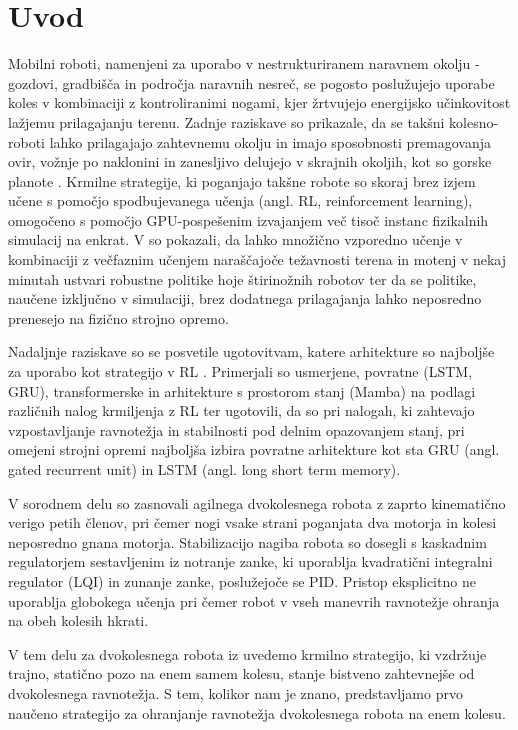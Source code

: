 \section{Uvod}

Mobilni roboti, namenjeni za uporabo v nestrukturiranem naravnem okolju - gozdovi, gradbišča in področja naravnih nesreč, se pogosto poslužujejo uporabe koles v kombinaciji z kontroliranimi nogami, kjer žrtvujejo energijsko učinkovitost lažjemu prilagajanju terenu. Zadnje raziskave so prikazale, da se takšni kolesno-roboti lahko prilagajajo zahtevnemu okolju in imajo sposobnosti premagovanja ovir, vožnje po naklonini in zanesljivo delujejo v skrajnih okoljih, kot so gorske planote \cite{Wang2025Whee}.
  Krmilne strategije, ki poganjajo takšne robote so skoraj brez izjem učene s pomočjo spodbujevanega učenja (angl. RL, reinforcement learning), omogočeno s pomočjo GPU-po\-spe\-še\-nim izvajanjem več tisoč instanc fizikalnih simulacij na enkrat. V \cite{Rudin2022Lear} so pokazali, da lahko množično vzporedno učenje v kombinaciji z večfaznim učenjem na\-ra\-šča\-jo\-če težavnosti terena in motenj v nekaj minutah ustvari robustne politike hoje štirinožnih robotov ter da se politike, naučene izključno v simulaciji, brez dodatnega prilagajanja lahko neposredno prenesejo na fizično strojno opremo.
  
  Nadaljnje raziskave so se posvetile ugotovitvam, katere arhitekture so najboljše za uporabo kot strategijo v RL \cite{Smirnov2025RLBe}. Primerjali so usmerjene, povratne (LSTM, GRU), transformerske in arhitekture s prostorom stanj (Mamba) na podlagi različnih nalog krmiljenja z RL ter ugotovili, da so pri nalogah, ki zahtevajo vzpostavljanje ravnotežja in stabilnosti pod delnim opazovanjem stanj, pri omejeni strojni opremi najboljša izbira povratne arhitekture kot sta GRU (angl. gated recurrent unit) in LSTM (angl. long short term memory).

  V sorodnem delu \cite{Tofant2025Dife} so zasnovali agilnega dvokolesnega robota z zaprto kinematično verigo petih členov, pri čemer nogi vsake strani poganjata dva motorja in kolesi neposredno gnana motorja. Stabilizacijo nagiba robota so dosegli s kaskadnim regulatorjem sestavljenim iz notranje zanke, ki uporablja kvadratični integralni regulator (LQI) in zunanje zanke, poslužejoče se PID. Pristop eksplicitno ne uporablja globokega učenja pri čemer robot v vseh manevrih ravnotežje ohranja na obeh kolesih hkrati.
  
  V tem delu za dvokolesnega robota iz \cite{Tofant2025Dife} uvedemo krmilno strategijo, ki vzdržuje trajno, statično pozo na enem samem kolesu, stanje bistveno zahtevnejše od dvokolesnega ravnotežja. S tem, kolikor nam je znano, predstavljamo prvo naučeno strategijo za ohranjanje ravnotežja dvokolesnega robota na enem kolesu.
  
